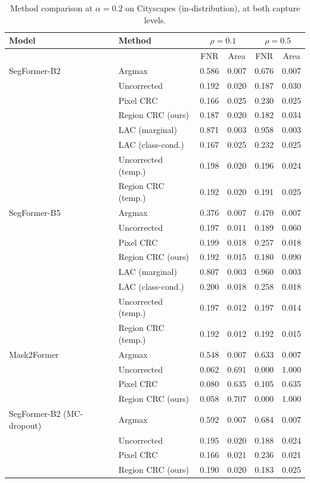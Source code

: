 \begin{table}[t]
\centering
\caption{Method comparison at $\alpha=0.2$ on Cityscapes (in-distribution), at both capture levels.}
\label{tab:baselines}
\scriptsize
\setlength{\tabcolsep}{2.5pt}
\begin{tabular}{llcccc}
\toprule
Model & Method & \multicolumn{2}{c}{$\rho=0.1$} & \multicolumn{2}{c}{$\rho=0.5$} \\
\midrule
 & & FNR & Area & FNR & Area \\
\midrule
SegFormer-B2 & Argmax & 0.586 & 0.007 & 0.676 & 0.007 \\
 & Uncorrected & 0.192 & 0.020 & 0.187 & 0.030 \\
 & Pixel CRC & 0.166 & 0.025 & 0.230 & 0.025 \\
 & Region CRC (ours) & 0.187 & 0.020 & 0.182 & 0.034 \\
 & LAC (marginal) & 0.871 & 0.003 & 0.958 & 0.003 \\
 & LAC (class-cond.) & 0.167 & 0.025 & 0.232 & 0.025 \\
 & Uncorrected (temp.) & 0.198 & 0.020 & 0.196 & 0.024 \\
 & Region CRC (temp.) & 0.192 & 0.020 & 0.191 & 0.025 \\
\addlinespace
SegFormer-B5 & Argmax & 0.376 & 0.007 & 0.470 & 0.007 \\
 & Uncorrected & 0.197 & 0.011 & 0.189 & 0.060 \\
 & Pixel CRC & 0.199 & 0.018 & 0.257 & 0.018 \\
 & Region CRC (ours) & 0.192 & 0.015 & 0.180 & 0.090 \\
 & LAC (marginal) & 0.807 & 0.003 & 0.960 & 0.003 \\
 & LAC (class-cond.) & 0.200 & 0.018 & 0.258 & 0.018 \\
 & Uncorrected (temp.) & 0.197 & 0.012 & 0.197 & 0.014 \\
 & Region CRC (temp.) & 0.192 & 0.012 & 0.192 & 0.015 \\
\addlinespace
Mask2Former & Argmax & 0.548 & 0.007 & 0.633 & 0.007 \\
 & Uncorrected & 0.062 & 0.691 & 0.000 & 1.000 \\
 & Pixel CRC & 0.080 & 0.635 & 0.105 & 0.635 \\
 & Region CRC (ours) & 0.058 & 0.707 & 0.000 & 1.000 \\
\addlinespace
SegFormer-B2 (MC-dropout) & Argmax & 0.592 & 0.007 & 0.684 & 0.007 \\
 & Uncorrected & 0.195 & 0.020 & 0.188 & 0.024 \\
 & Pixel CRC & 0.166 & 0.021 & 0.236 & 0.021 \\
 & Region CRC (ours) & 0.190 & 0.020 & 0.183 & 0.025 \\
\bottomrule
\end{tabular}
\end{table}
